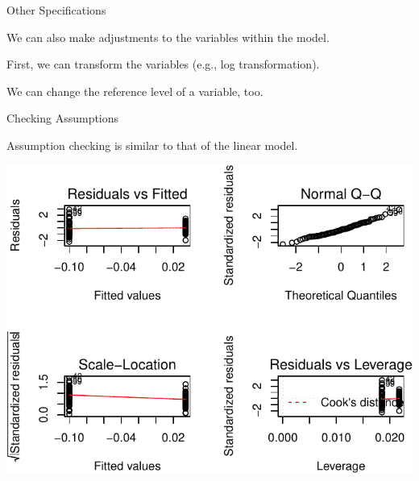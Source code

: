 \begin{frame}[fragile]{Other Specifications}

We can also make adjustments to the variables within the model.

First, we can transform the variables (e.g., log transformation).

\begin{Shaded}
\begin{Highlighting}[]
\StringTok{ }\NormalTok{(}\OperatorTok{~}\StringTok{ }\OperatorTok{*}
\end{Highlighting}
\end{Shaded}

We can change the reference level of a variable, too.

\begin{Shaded}
\begin{Highlighting}[]
\StringTok{ }\OperatorTok{~}\StringTok{ } \NormalTok{), }
\end{Highlighting}
\end{Shaded}

\end{frame}

\begin{frame}[fragile]{Checking Assumptions}

Assumption checking is similar to that of the linear model.

\begin{Shaded}
\begin{Highlighting}[]
\NormalTok{(} \NormalTok{(}\NormalTok{,}\NormalTok{))}
\end{Highlighting}
\end{Shaded}

\includegraphics{04_BasicAnalyses_files/figure-beamer/unnamed-chunk-23-1.pdf}

\end{frame}

